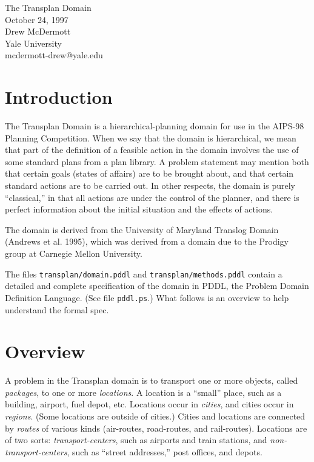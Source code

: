 \documentclass{article}
\begin{document}
\begin{center}
The Transplan Domain \\
October 24, 1997 \\
Drew McDermott \\
Yale University \\
mcdermott-drew@yale.edu
\end{center}

\section{Introduction}

The Transplan Domain is a hierarchical-planning domain for use in the
AIPS-98 Planning Competition.  When we say that the domain is
hierarchical, we mean that part of the definition of a feasible action
in the domain involves the use of some standard plans from a plan
library.  A problem statement may mention both that certain goals
(states of affairs) are to be brought about, and that certain standard
actions are to be carried out.  In other respects, the domain is
purely ``classical,'' in 
that all actions are under the control of the planner, and there is
perfect information about the initial situation and the effects of
actions.

The domain is derived from the University of Maryland Translog
Domain (Andrews et al. 1995), which was derived from a domain due to
the Prodigy 
group at Carnegie Mellon University.

The files {\tt transplan/domain.pddl} and {\tt transplan/methods.pddl}
contain a detailed and complete specification of the domain in PDDL,
the Problem 
Domain Definition Language.  (See file {\tt  pddl.ps}.)  What follows
is an overview to help understand the formal spec.

\section{Overview}

A problem in the Transplan domain is to transport one or more objects,
called {\em packages}, to one or more {\em locations}.  A location is
a ``small'' place, such as a building, airport, fuel depot, etc.
Locations occur in {\em cities}, and cities occur in {\em regions}.
(Some locations are outside of cities.)  Cities and locations are
connected by {\em routes} of various kinds (air-routes, road-routes,
and rail-routes).  Locations are of two sorts: {\em
transport-centers}, such as airports and train stations, 
and {\em non-transport-centers}, such as ``street addresses,'' post
offices, and depots.
\end{document}
